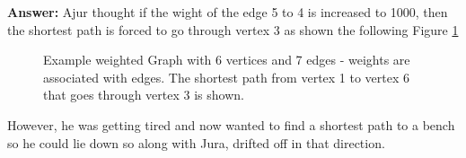 \textbf{Answer:} Ajur thought if the wight of the edge 5 to 4 is increased to 1000, then the shortest path is forced to go through vertex 3 as shown the following Figure \ref{12qa1}

\begin{figure}
\begin{center}
\caption{ Example weighted Graph with 6 vertices and 7 edges - weights are associated with edges. The shortest path from vertex 1 to vertex 6 that goes through vertex 3 is shown.}\label{12qa1}
\end{center}
\end{figure}

However, he was getting tired and now wanted to find a shortest path to a bench so he could lie down so along with Jura, drifted off in that direction.